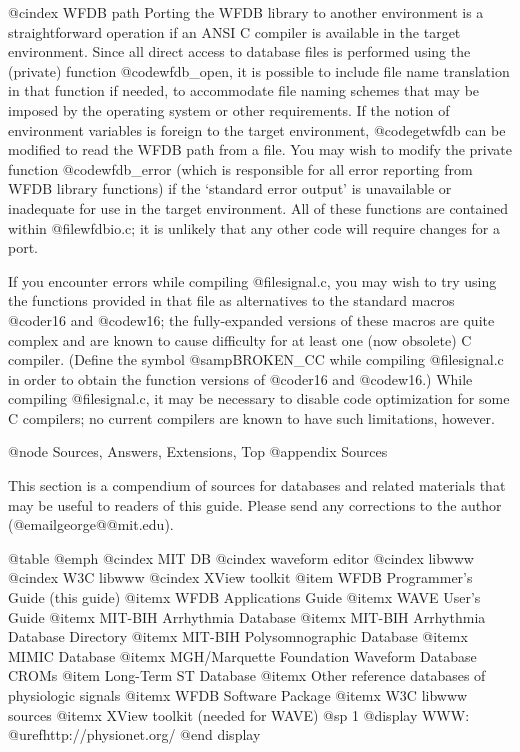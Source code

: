 {{{{{{{{@cindex WFDB path
Porting the WFDB library to another environment is a straightforward
operation if an ANSI C compiler is available in the target environment.
Since all direct access to database files is performed using the
(private) function @code{wfdb_open}, it is possible to include file name
translation in that function if needed, to accommodate file naming
schemes that may be imposed by the operating system or other
requirements.  If the notion of environment variables is foreign to the
target environment, @code{getwfdb} can be modified to read the WFDB path
from a file.  You may wish to modify the private function
@code{wfdb_error} (which is responsible for all error reporting from WFDB
library functions) if the `standard error output' is unavailable or
inadequate for use in the target environment.  All of these functions are
contained within @file{wfdbio.c}; it is unlikely that any other code will
require changes for a port.

If you encounter errors while compiling @file{signal.c}, you may wish to try
using the functions provided in that file as alternatives to the standard
macros @code{r16} and @code{w16}; the fully-expanded versions of these macros
are quite complex and are known to cause difficulty for at least one (now
obsolete) C compiler.  (Define the symbol @samp{BROKEN_CC} while compiling
@file{signal.c} in order to obtain the function versions of @code{r16} and
@code{w16}.)  While compiling @file{signal.c}, it may be necessary to disable
code optimization for some C compilers;  no current compilers are known to
have such limitations, however.

@node     Sources, Answers, Extensions, Top
@appendix Sources

This section is a compendium of sources for databases and related
materials that may be useful to readers of this guide.  Please send any
corrections to the author (@email{george@@mit.edu}).

@table @emph
@cindex MIT DB
@cindex waveform editor
@cindex libwww
@cindex W3C libwww
@cindex XView toolkit
@item WFDB Programmer's Guide (this guide)
@itemx WFDB Applications Guide
@itemx WAVE User's Guide
@itemx MIT-BIH Arrhythmia Database
@itemx MIT-BIH Arrhythmia Database Directory
@itemx MIT-BIH Polysomnographic Database
@itemx MIMIC Database
@itemx MGH/Marquette Foundation Waveform Database CROMs
@item Long-Term ST Database
@itemx Other reference databases of physiologic signals
@itemx WFDB Software Package
@itemx W3C libwww sources
@itemx XView toolkit (needed for WAVE)
@sp 1
@display
WWW: @uref{http://physionet.org/}
@end display

}}}}}}}}

